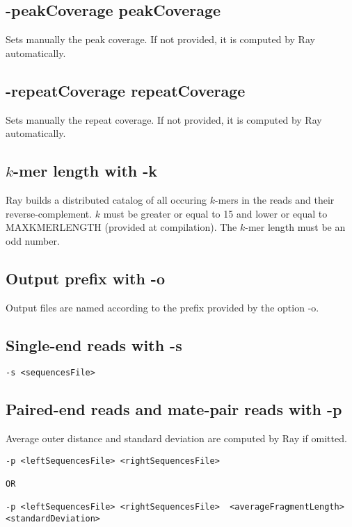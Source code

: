 \documentclass{article}
\begin{document}
\subsection{-peakCoverage peakCoverage}

Sets manually the peak coverage.
If not provided, it is computed by Ray automatically.


\subsection{-repeatCoverage repeatCoverage}

Sets manually the repeat coverage.
If not provided, it is computed by Ray automatically.

\subsection{$k$-mer length with -k}

Ray builds a distributed catalog of all occuring $k$-mers in the reads and their reverse-complement. $k$ must be greater or equal to 15 and lower or equal to MAXKMERLENGTH (provided at compilation). The $k$-mer length must be an odd number.

\subsection{Output prefix with -o}

Output files are named according to the prefix provided by the option -o.

\subsection{Single-end reads with -s}

\begin{verbatim}
-s <sequencesFile>
\end{verbatim}

\subsection{Paired-end reads and mate-pair reads with -p}

Average outer distance and standard deviation are computed by Ray if omitted.

\begin{verbatim}
-p <leftSequencesFile> <rightSequencesFile>  

OR

-p <leftSequencesFile> <rightSequencesFile>  <averageFragmentLength> <standardDeviation> 
\end{verbatim}
\end{document}

